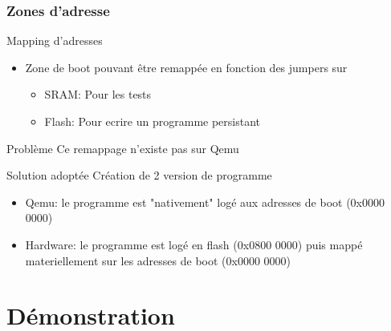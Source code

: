 \documentclass{beamer}
\begin{document}
			\begin{frame}
				\frametitle{Zones d'adresse}
				\begin{block}{ Mapping d'adresses }
					\begin{itemize}
						\item Zone de boot pouvant être remappée en fonction des jumpers sur
							\begin{itemize}
								\item SRAM: Pour les tests
								\item Flash: Pour ecrire un programme persistant
							\end{itemize}
					\end{itemize}
				\end{block}
				\begin{alertblock}{ Problème }
					Ce remappage n'existe pas sur Qemu
				\end{alertblock}
				\begin{exampleblock}{ Solution adoptée }
					Création de 2 version de programme
					\begin{itemize}
						\item Qemu: le programme est "nativement" logé aux adresses de boot (0x0000 0000)
						\item Hardware: le programme est logé en flash (0x0800 0000) puis mappé materiellement sur les adresses de boot (0x0000 0000)
					\end{itemize}
				\end{exampleblock}
			\end{frame}
	
	
	\section{Démonstration}
\end{document}

